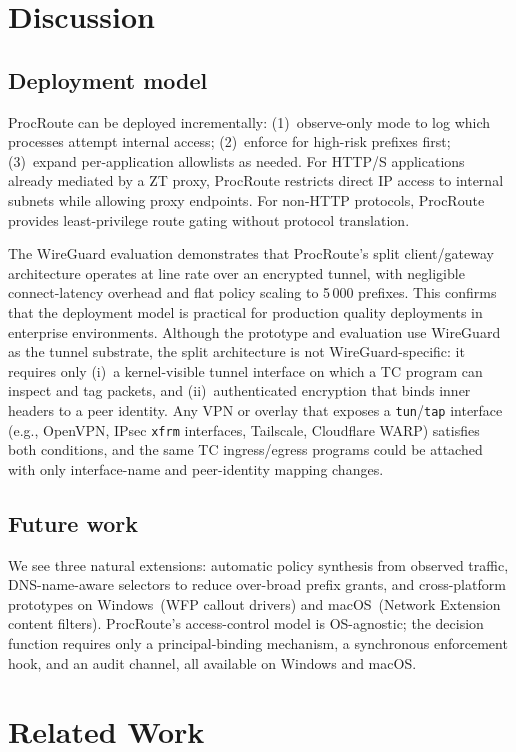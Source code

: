 \documentclass[sigconf]{acmart}
\begin{document}
\section{Discussion}
\label{sec:discussion}

\subsection{Deployment model}
ProcRoute can be deployed incrementally: (1)~observe-only mode to
log which processes attempt internal access; (2)~enforce for
high-risk prefixes first; (3)~expand per-application allowlists as
needed.
For HTTP/S applications already mediated by a ZT proxy, ProcRoute
restricts direct IP access to internal subnets while allowing
proxy endpoints.
For non-HTTP protocols,
ProcRoute provides least-privilege route gating without protocol
translation.

The WireGuard evaluation
demonstrates that ProcRoute's split client/gateway architecture
operates at line rate over an encrypted tunnel, with negligible
connect-latency overhead and flat policy scaling to 5\,000
prefixes. This confirms that the deployment model is practical for
production quality deployments in enterprise environments.
Although the prototype and evaluation use WireGuard as the
tunnel substrate, the split architecture is not WireGuard-specific:
it requires only (i)~a kernel-visible tunnel interface on which
a TC program can inspect and tag packets, and (ii)~authenticated
encryption that binds inner headers to a peer identity.
Any VPN or overlay that exposes a \texttt{tun}/\texttt{tap}
interface (e.g., OpenVPN, IPsec \texttt{xfrm} interfaces,
Tailscale, Cloudflare WARP) satisfies both conditions, and the
same TC ingress/egress programs could be attached with only
interface-name and peer-identity mapping changes.

\subsection{Future work}
We see three natural extensions: automatic policy synthesis from observed
traffic, DNS-name-aware selectors to reduce over-broad prefix
grants, and cross-platform prototypes on Windows~(WFP callout
drivers) and macOS~(Network Extension content filters).
ProcRoute's access-control model is OS-agnostic; the decision
function requires only a principal-binding mechanism, a synchronous
enforcement hook, and an audit channel, all available on Windows and macOS.

\section{Related Work}
\end{document}
